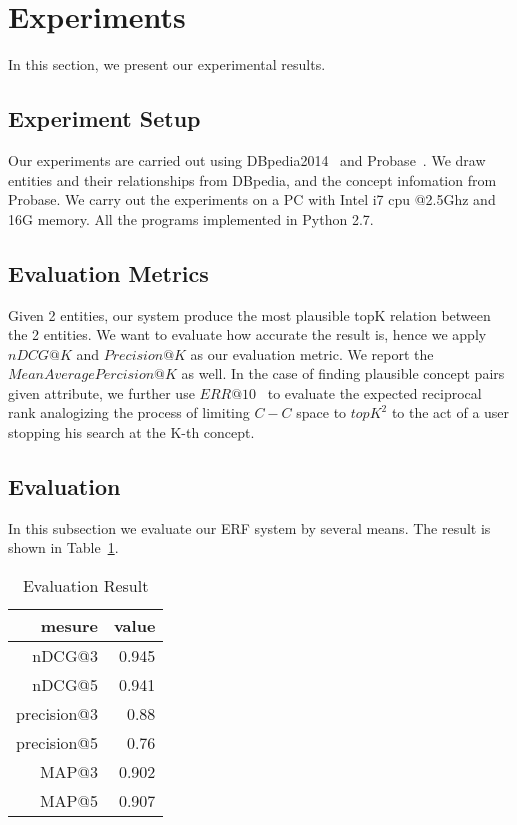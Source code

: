 \section{Experiments}
\label{sec:exp}

In this section, we present our experimental results.

\subsection{Experiment Setup}

Our experiments are carried out using DBpedia2014~\cite{dbpedia} and Probase~\cite{wu2012probase}.
We draw entities and their relationships from DBpedia, and the concept infomation from Probase.
We carry out the experiments on a PC with Intel i7 cpu @2.5Ghz and 16G memory.
All the programs implemented in Python 2.7.

\subsection{Evaluation Metrics}

Given 2 entities, our system produce the most plausible topK relation between the 2 entities.
We want to evaluate how accurate the result is, hence we apply $nDCG@K$ and $Precision@K$ as our evaluation metric.
We report the $Mean Average Percision@K$ as well.
In the case of finding plausible concept pairs given attribute, we further use $ ERR@10$~\cite{chapelle2009expected} to evaluate the expected reciprocal rank analogizing the process of limiting $C-C$ space to $topK^2$ to the act of a user stopping his search at the K-th concept.



\subsection{Evaluation}
In this subsection we evaluate our ERF system by several means.
The result is shown in Table~\ref{tab:ndcg}.

\begin{table}[htbp]
  \centering
  \caption{Evaluation Result}
    \begin{tabular}{rr}
    \toprule
    mesure & value \\
    \midrule
    nDCG@3 & 0.945 \\
    nDCG@5 & 0.941 \\
    precision@3 & 0.88 \\
    precision@5 & 0.76 \\
    MAP@3 & 0.902 \\
    MAP@5 & 0.907 \\

    \bottomrule
    \end{tabular}%
  \label{tab:ndcg}%
\end{table}%


